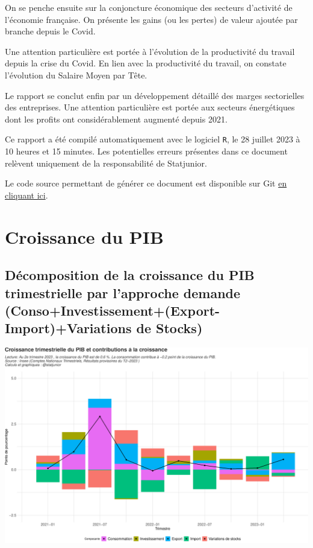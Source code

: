 \documentclass[
  paper=a4,
  ,captions=tableheading
]{scrartcl}
\begin{document}
On se penche ensuite sur la conjoncture économique des secteurs
d'activité de l'économie française. On présente les gains (ou les
pertes) de valeur ajoutée par branche depuis le Covid.

Une attention particulière est portée à l'évolution de la productivité
du travail depuis la crise du Covid. En lien avec la productivité du
travail, on constate l'évolution du Salaire Moyen par Tête.

Le rapport se conclut enfin par un développement détaillé des marges
sectorielles des entreprises. Une attention particulière est portée aux
secteurs énergétiques dont les profits ont considérablement augmenté
depuis 2021.

Ce rapport a été compilé automatiquement avec le logiciel \texttt{R}, le
28 juillet 2023 à 10 heures et 15 minutes. Les potentielles erreurs
présentes dans ce document relèvent uniquement de la responsabilité de
Statjunior.

Le code source permettant de générer ce document est disponible sur Git
\href{https://github.com/statjunior/Statjunior/tree/main/Conjoncture\%20-\%20comptes\%20trimestriels/}{en
cliquant ici}.

\newpage

\hypertarget{croissance-du-pib}{%
\section{Croissance du PIB}\label{croissance-du-pib}}

\hypertarget{duxe9composition-de-la-croissance-du-pib-trimestrielle-par-lapproche-demande-consoinvestissementexport-importvariations-de-stocks}{%
\subsection{Décomposition de la croissance du PIB trimestrielle par
l'approche demande (Conso+Investissement+(Export-Import)+Variations de
Stocks)}\label{duxe9composition-de-la-croissance-du-pib-trimestrielle-par-lapproche-demande-consoinvestissementexport-importvariations-de-stocks}}

\includegraphics{rapport_pdf_compte_branche_files/figure-latex/unnamed-chunk-2-1.pdf}
\end{document}
